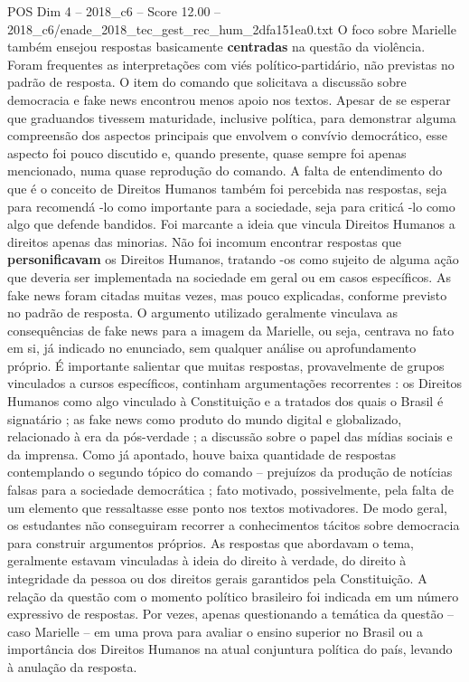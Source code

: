 \begin{textsample}{POS Dim 4 – 2018\_c6 – Score 12.00 – 2018\_c6/enade\_2018\_tec\_gest\_rec\_hum\_2dfa151ea0.txt}
O foco sobre Marielle também ensejou respostas basicamente \textbf{centradas} na questão da violência.
Foram frequentes as interpretações com viés político-partidário, não previstas no padrão de resposta.
O item do comando que solicitava a discussão sobre democracia e fake news encontrou menos apoio nos textos.
Apesar de se esperar que graduandos tivessem maturidade, inclusive política, para demonstrar alguma compreensão dos aspectos principais que envolvem o convívio democrático, esse aspecto foi pouco discutido e, quando presente, quase sempre foi apenas mencionado, numa quase reprodução do comando.
A falta de entendimento do que é o conceito de Direitos Humanos também foi percebida nas respostas, seja para recomendá -lo como importante para a sociedade, seja para criticá -lo como algo que defende bandidos.
Foi marcante a ideia que vincula Direitos Humanos a direitos apenas das minorias.
Não foi incomum encontrar respostas que \textbf{personificavam} os Direitos Humanos, tratando -os como sujeito de alguma ação que deveria ser implementada na sociedade em geral ou em casos específicos.
As fake news foram citadas muitas vezes, mas pouco explicadas, conforme previsto no padrão de resposta.
O argumento utilizado geralmente vinculava as consequências de fake news para a imagem da Marielle, ou seja, centrava no fato em si, já indicado no enunciado, sem qualquer análise ou aprofundamento próprio.
É importante salientar que muitas respostas, provavelmente de grupos vinculados a cursos específicos, continham argumentações recorrentes : os Direitos Humanos como algo vinculado à Constituição e a tratados dos quais o Brasil é signatário ; as fake news como produto do mundo digital e globalizado, relacionado à era da pós-verdade ; a discussão sobre o papel das mídias sociais e da imprensa.
Como já apontado, houve baixa quantidade de respostas contemplando o segundo tópico do comando – prejuízos da produção de notícias falsas para a sociedade democrática ; fato motivado, possivelmente, pela falta de um elemento que ressaltasse esse ponto nos textos motivadores.
De modo geral, os estudantes não conseguiram recorrer a conhecimentos tácitos sobre democracia para construir argumentos próprios.
As respostas que abordavam o tema, geralmente estavam vinculadas à ideia do direito à verdade, do direito à integridade da pessoa ou dos direitos gerais garantidos pela Constituição.
A relação da questão com o momento político brasileiro foi indicada em um número expressivo de respostas.
Por vezes, apenas questionando a temática da questão – caso Marielle – em uma prova para avaliar o ensino superior no Brasil ou a importância dos Direitos Humanos na atual conjuntura política do país, levando à anulação da resposta.

\end{textsample}

